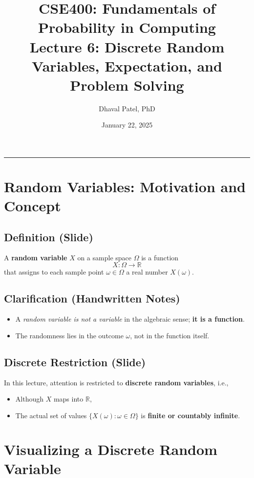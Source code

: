 \documentclass[11pt]{article}
\title{CSE400: Fundamentals of Probability in Computing\\
Lecture 6: Discrete Random Variables, Expectation, and Problem Solving}
\author{Dhaval Patel, PhD}
\date{January 22, 2025}
\begin{document}
\maketitle

\hrule
\vspace{0.5em}

\section{Random Variables: Motivation and Concept}

\subsection*{Definition (Slide)}

A \textbf{random variable} \( X \) on a sample space \( \Omega \) is a function
\[
X : \Omega \rightarrow \mathbb{R}
\]
that assigns to each sample point \( \omega \in \Omega \) a real number \( X(\omega) \).

\subsection*{Clarification (Handwritten Notes)}

\begin{itemize}
    \item A \emph{random variable is not a variable} in the algebraic sense; \textbf{it is a function}.
    \item The randomness lies in the outcome \( \omega \), not in the function itself.
\end{itemize}

\subsection*{Discrete Restriction (Slide)}

In this lecture, attention is restricted to \textbf{discrete random variables}, i.e.,
\begin{itemize}
    \item Although \( X \) maps into \( \mathbb{R} \),
    \item The actual set of values \( \{ X(\omega) : \omega \in \Omega \} \) is \textbf{finite or countably infinite}.
\end{itemize}


\vspace{1em}

\section{Visualizing a Discrete Random Variable}
\end{document}
